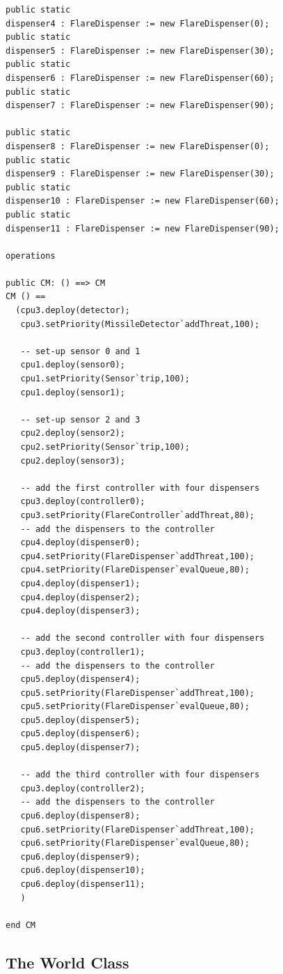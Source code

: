\documentclass{overturerepchap}
\begin{document}
\begin{lstlisting}
public static 
dispenser4 : FlareDispenser := new FlareDispenser(0);
public static 
dispenser5 : FlareDispenser := new FlareDispenser(30);
public static 
dispenser6 : FlareDispenser := new FlareDispenser(60);
public static 
dispenser7 : FlareDispenser := new FlareDispenser(90);

public static 
dispenser8 : FlareDispenser := new FlareDispenser(0);
public static 
dispenser9 : FlareDispenser := new FlareDispenser(30);
public static 
dispenser10 : FlareDispenser := new FlareDispenser(60);
public static 
dispenser11 : FlareDispenser := new FlareDispenser(90);
  
operations

public CM: () ==> CM
CM () ==
  (cpu3.deploy(detector);
   cpu3.setPriority(MissileDetector`addThreat,100);

   -- set-up sensor 0 and 1
   cpu1.deploy(sensor0);
   cpu1.setPriority(Sensor`trip,100);
   cpu1.deploy(sensor1);

   -- set-up sensor 2 and 3
   cpu2.deploy(sensor2);
   cpu2.setPriority(Sensor`trip,100);
   cpu2.deploy(sensor3);

   -- add the first controller with four dispensers
   cpu3.deploy(controller0);
   cpu3.setPriority(FlareController`addThreat,80);
   -- add the dispensers to the controller
   cpu4.deploy(dispenser0);
   cpu4.setPriority(FlareDispenser`addThreat,100);
   cpu4.setPriority(FlareDispenser`evalQueue,80);
   cpu4.deploy(dispenser1);
   cpu4.deploy(dispenser2);
   cpu4.deploy(dispenser3);

   -- add the second controller with four dispensers
   cpu3.deploy(controller1);
   -- add the dispensers to the controller
   cpu5.deploy(dispenser4);
   cpu5.setPriority(FlareDispenser`addThreat,100);
   cpu5.setPriority(FlareDispenser`evalQueue,80);
   cpu5.deploy(dispenser5);
   cpu5.deploy(dispenser6);
   cpu5.deploy(dispenser7);

   -- add the third controller with four dispensers
   cpu3.deploy(controller2);
   -- add the dispensers to the controller
   cpu6.deploy(dispenser8);
   cpu6.setPriority(FlareDispenser`addThreat,100);
   cpu6.setPriority(FlareDispenser`evalQueue,80);
   cpu6.deploy(dispenser9);
   cpu6.deploy(dispenser10);
   cpu6.deploy(dispenser11);
   )

end CM
\end{lstlisting}

\subsection{The World Class}
\end{document}
